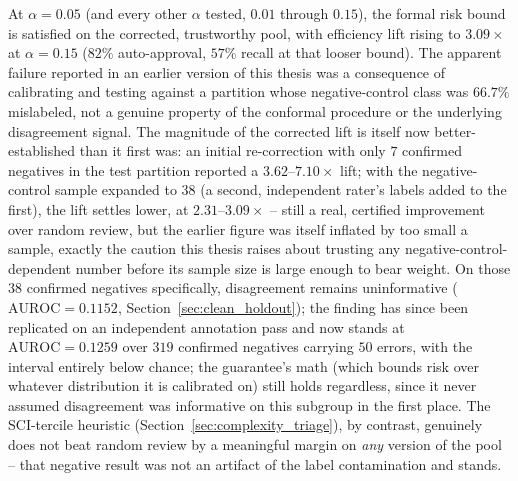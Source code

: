 \documentclass[12pt,a4paper]{report}
\begin{document}
At $\alpha=0.05$ (and every other $\alpha$ tested, $0.01$ through $0.15$), the formal risk bound is satisfied on the corrected, trustworthy pool, with efficiency lift rising to $3.09\times$ at $\alpha=0.15$ ($82\%$ auto-approval, $57\%$ recall at that looser bound). The apparent failure reported in an earlier version of this thesis was a consequence of calibrating and testing against a partition whose negative-control class was $66.7\%$ mislabeled, not a genuine property of the conformal procedure or the underlying disagreement signal. The magnitude of the corrected lift is itself now better-established than it first was: an initial re-correction with only $7$ confirmed negatives in the test partition reported a $3.62$--$7.10\times$ lift; with the negative-control sample expanded to $38$ (a second, independent rater's labels added to the first), the lift settles lower, at $2.31$--$3.09\times$ -- still a real, certified improvement over random review, but the earlier figure was itself inflated by too small a sample, exactly the caution this thesis raises about trusting any negative-control-dependent number before its sample size is large enough to bear weight. On those $38$ confirmed negatives specifically, disagreement remains uninformative ($\text{AUROC}=0.1152$, Section~\ref{sec:clean_holdout}); the finding has since been replicated on an independent annotation pass and now stands at $\text{AUROC}=0.1259$ over $319$ confirmed negatives carrying $50$ errors, with the interval entirely below chance; the guarantee's math (which bounds risk over whatever distribution it is calibrated on) still holds regardless, since it never assumed disagreement was informative on this subgroup in the first place. The SCI-tercile heuristic (Section~\ref{sec:complexity_triage}), by contrast, genuinely does not beat random review by a meaningful margin on \emph{any} version of the pool -- that negative result was not an artifact of the label contamination and stands.
\end{document}
